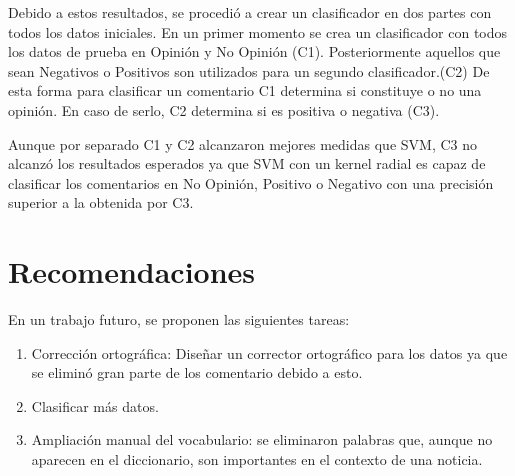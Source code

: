 \documentclass[]{article}
\begin{document}
Debido a estos resultados, se procedió a crear un clasificador en dos partes con todos los datos iniciales. En un primer momento se crea un clasificador con todos los datos de prueba en Opinión y No Opinión (C1). Posteriormente aquellos que sean Negativos o Positivos son utilizados para un segundo clasificador.(C2) De esta forma para clasificar un comentario C1 determina si constituye o no una opinión. En caso de serlo, C2 determina si es positiva o negativa (C3).

Aunque por separado C1 y C2 alcanzaron mejores medidas que SVM, C3 no alcanzó los resultados esperados ya que SVM con un kernel radial es capaz de clasificar los comentarios en No Opinión, Positivo o Negativo con una precisión superior a la obtenida por C3.

\section{Recomendaciones}

En un trabajo futuro, se proponen las siguientes tareas:

\begin{enumerate}
    \item Corrección ortográfica: Diseñar un corrector ortográfico para los datos ya que se eliminó gran parte de los comentario debido a esto.
    \item Clasificar más datos.
    \item Ampliación manual del vocabulario: se eliminaron palabras que, aunque no aparecen en el diccionario, son importantes en el contexto de una noticia.
\end{enumerate}
\end{document}
